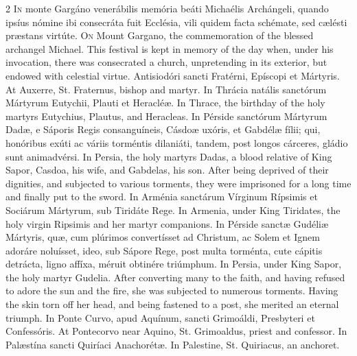\begin{paracol}{2}
\lettrine[lines=2]{I}{n} monte Gargáno 
 venerábilis memória beáti Michaélis Archángeli, quando ipsíus nómine ibi 
 consecráta fuit Ecclésia, vili quidem facta schémate, sed cælésti 
 præstans virtúte.
\switchcolumn
{}
\lettrine[lines=2]{O}{n} Mount Gargano, the commemoration 
 of the blessed archangel Michael. This festival is kept in memory of 
 the day when, under his invocation, there was consecrated a church, 
 unpretending in its exterior, but endowed with celestial virtue.
\switchcolumn*
{}
Antisiodóri sancti 
 Fratérni, Epíscopi et Mártyris.
\switchcolumn
{}
At Auxerre, St. Fraternus, bishop 
 and martyr.
\switchcolumn*
{}
In Thrácia natális 
 sanctórum Mártyrum Eutychii, Plauti et Heracléæ.
\switchcolumn
{}
In Thrace, the birthday of the holy 
 martyrs Eutychius, Plautus, and Heracleas.
\switchcolumn*
{}
In Pérside sanctórum 
 Mártyrum Dadæ, e Sáporis Regis consanguíneis, Cásdoæ uxóris, et Gabdélæ 
 fílii; qui, honóribus exúti ac váriis torméntis dilaniáti, tandem, post 
 longos cárceres, gládio sunt animadvérsi.
\switchcolumn
{}
In Persia, the holy martyrs Dadas, a 
 blood relative of King Sapor, Casdoa, his wife, and Gabdelas, his son. 
 After being deprived of their dignities, and subjected to various torments, 
 they were imprisoned for a long time and finally put to the sword.
\switchcolumn*
{}
In Arménia sanctárum 
 Vírginum Rípsimis et Sociárum Mártyrum, sub Tiridáte Rege.
\switchcolumn
{}
In Armenia, under King Tiridates, 
 the holy virgin Ripsimis and her martyr companions.
\switchcolumn*
{}
In Pérside sanctæ 
 Gudéliæ Mártyris, quæ, cum plúrimos convertísset ad Christum, ac Solem et 
 Ignem adoráre noluísset, ideo, sub Sápore Rege, post multa torménta, cute 
 cápitis detrácta, ligno affíxa, méruit obtinére triúmphum.
\switchcolumn
{}
In Persia, under King Sapor, the 
 holy martyr Gudelia. After converting many to the faith, and having 
 refused to adore the sun and the fire, she was subjected to numerous 
 torments. Having the skin torn off her head, and being fastened to a 
 post, she merited an eternal triumph.
\switchcolumn*
{}
In Ponte Curvo, apud 
 Aquínum, sancti Grimoáldi, Presbyteri et Confessóris.
\switchcolumn
{}
At Pontecorvo near Aquino, St. 
 Grimoaldus, priest and confessor.
\switchcolumn*
{}
In Palæstína sancti 
 Quiríaci Anachorétæ.
\switchcolumn
{}
In Palestine, St. Quiriacus, an 
 anchoret.
\switchcolumn*
{}
\end{paracol}


